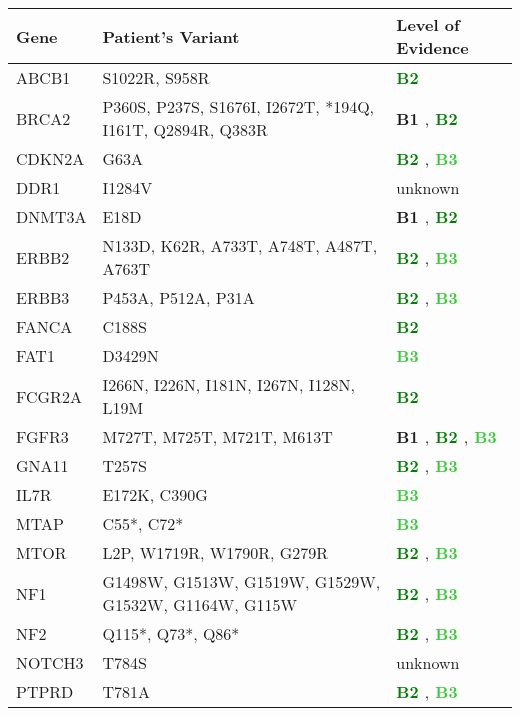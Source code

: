 \documentclass[9pt]{article}\usepackage[]{graphicx}\usepackage[table,dvipsnames]{xcolor}
\begin{document}
\begin{longtable}{p{0.6in}p{2.0in}p{0.8in}}
  \hline
\textbf{ Gene } & \textbf{ Patient's Variant } & \textbf{ Level of Evidence } \\ 
  \hline
ABCB1 & S1022R, S958R & \textbf{\textcolor{Green}{ B2 }} \\ 
  BRCA2 & P360S, P237S, S1676I, I2672T, *194Q, I161T, Q2894R, Q383R & \textbf{\textcolor{OliveGreen}{ B1 }},\textbf{\textcolor{Green}{ B2 }} \\ 
  CDKN2A & G63A & \textbf{\textcolor{Green}{ B2 }},\textbf{\textcolor{LimeGreen}{ B3 }} \\ 
  DDR1 & I1284V & unknown \\ 
  DNMT3A & E18D & \textbf{\textcolor{OliveGreen}{ B1 }},\textbf{\textcolor{Green}{ B2 }} \\ 
  ERBB2 & N133D, K62R, A733T, A748T, A487T, A763T & \textbf{\textcolor{Green}{ B2 }},\textbf{\textcolor{LimeGreen}{ B3 }} \\ 
  ERBB3 & P453A, P512A, P31A & \textbf{\textcolor{Green}{ B2 }},\textbf{\textcolor{LimeGreen}{ B3 }} \\ 
  FANCA & C188S & \textbf{\textcolor{Green}{ B2 }} \\ 
  FAT1 & D3429N & \textbf{\textcolor{LimeGreen}{ B3 }} \\ 
  FCGR2A & I266N, I226N, I181N, I267N, I128N, L19M & \textbf{\textcolor{Green}{ B2 }} \\ 
  FGFR3 & M727T, M725T, M721T, M613T & \textbf{\textcolor{OliveGreen}{ B1 }},\textbf{\textcolor{Green}{ B2 }},\textbf{\textcolor{LimeGreen}{ B3 }} \\ 
  GNA11 & T257S & \textbf{\textcolor{Green}{ B2 }},\textbf{\textcolor{LimeGreen}{ B3 }} \\ 
  IL7R & E172K, C390G & \textbf{\textcolor{LimeGreen}{ B3 }} \\ 
  MTAP & C55*, C72* & \textbf{\textcolor{LimeGreen}{ B3 }} \\ 
  MTOR & L2P, W1719R, W1790R, G279R & \textbf{\textcolor{Green}{ B2 }},\textbf{\textcolor{LimeGreen}{ B3 }} \\ 
  NF1 & G1498W, G1513W, G1519W, G1529W, G1532W, G1164W, G115W & \textbf{\textcolor{Green}{ B2 }},\textbf{\textcolor{LimeGreen}{ B3 }} \\ 
  NF2 & Q115*, Q73*, Q86* & \textbf{\textcolor{Green}{ B2 }},\textbf{\textcolor{LimeGreen}{ B3 }} \\ 
  NOTCH3 & T784S & unknown \\ 
  PTPRD & T781A & \textbf{\textcolor{Green}{ B2 }},\textbf{\textcolor{LimeGreen}{ B3 }} \\ 

\end{longtable}
\end{document}
